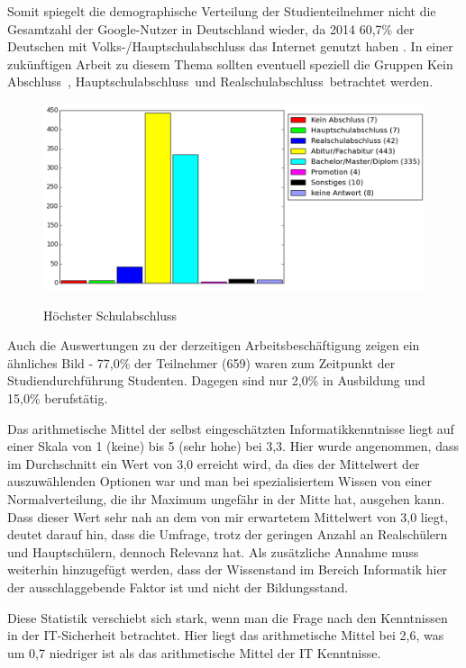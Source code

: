 Somit spiegelt die demographische Verteilung der Studienteilnehmer nicht die Gesamtzahl der Google-Nutzer in Deutschland wieder, da 2014 60,7\% der Deutschen mit Volks-/Hauptschulabschluss das Internet genutzt haben \cite{statistabildung}. In einer zukünftigen Arbeit zu diesem Thema sollten eventuell speziell die Gruppen \glqq Kein Abschluss\grqq\ , \glqq Hauptschulabschluss\grqq\ und \glqq Realschulabschluss\grqq\ betrachtet werden.

\begin{figure}[H]
\centering
\includegraphics[scale=0.55]{images/schulabschluss}\\
\caption{Höchster Schulabschluss}\label{schulabschluss}
\end{figure}
Auch die Auswertungen zu der derzeitigen Arbeitsbeschäftigung zeigen ein ähnliches Bild - 77,0\% der Teilnehmer (659) waren zum Zeitpunkt der Studiendurchführung Studenten. Dagegen sind nur 2,0\% in Ausbildung und 15,0\% berufstätig.

Das arithmetische Mittel der selbst eingeschätzten Informatikkenntnisse liegt auf einer Skala von 1 (keine) bis 5 (sehr hohe) bei 3,3. Hier wurde angenommen, dass im Durchschnitt ein Wert von 3,0 erreicht wird, da dies der Mittelwert der auszuwählenden Optionen war und man bei spezialisiertem Wissen von einer Normalverteilung, die ihr Maximum ungefähr in der Mitte hat, ausgehen kann. Dass dieser Wert sehr nah an dem von mir erwartetem Mittelwert von 3,0 liegt, deutet darauf hin, dass die Umfrage, trotz der geringen Anzahl an Realschülern und Hauptschülern, dennoch Relevanz hat. Als zusätzliche Annahme muss weiterhin hinzugefügt werden, dass der Wissenstand im Bereich Informatik hier der ausschlaggebende Faktor ist und nicht der Bildungsstand.

Diese Statistik verschiebt sich stark, wenn man die Frage nach den Kenntnissen in der IT-Sicherheit betrachtet. Hier liegt das arithmetische Mittel bei 2,6, was um 0,7 niedriger ist als das arithmetische Mittel der IT Kenntnisse.


